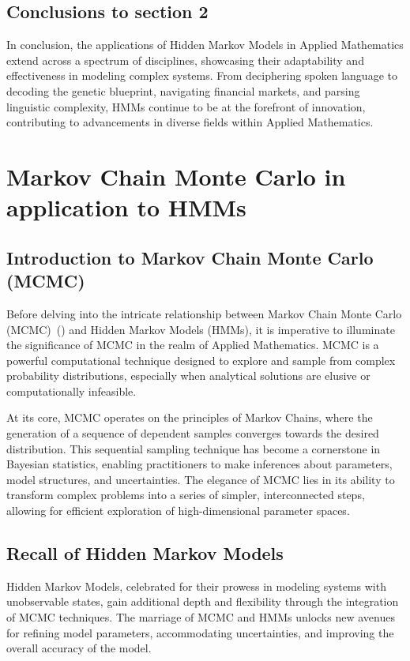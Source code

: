 \documentclass{englishreport}
\begin{document}
\subsection{Conclusions to section 2}

In conclusion, the applications of Hidden Markov Models in Applied Mathematics extend across a spectrum of disciplines, showcasing their adaptability and effectiveness in modeling complex systems. From deciphering spoken language to decoding the genetic blueprint, navigating financial markets, and parsing linguistic complexity, HMMs continue to be at the forefront of innovation, contributing to advancements in diverse fields within Applied Mathematics.

\newpage
\section{Markov Chain Monte Carlo in application to HMMs}

\subsection{Introduction to Markov Chain Monte Carlo (MCMC)}

Before delving into the intricate relationship between Markov Chain Monte Carlo (MCMC)~(\cite{Andrieu2008}) and Hidden Markov Models (HMMs), it is imperative to illuminate the significance of MCMC in the realm of Applied Mathematics. MCMC is a powerful computational technique designed to explore and sample from complex probability distributions, especially when analytical solutions are elusive or computationally infeasible.

At its core, MCMC operates on the principles of Markov Chains, where the generation of a sequence of dependent samples converges towards the desired distribution. This sequential sampling technique has become a cornerstone in Bayesian statistics, enabling practitioners to make inferences about parameters, model structures, and uncertainties. The elegance of MCMC lies in its ability to transform complex problems into a series of simpler, interconnected steps, allowing for efficient exploration of high-dimensional parameter spaces.

\subsection{Recall of Hidden Markov Models}

Hidden Markov Models, celebrated for their prowess in modeling systems with unobservable states, gain additional depth and flexibility through the integration of MCMC techniques. The marriage of MCMC and HMMs unlocks new avenues for refining model parameters, accommodating uncertainties, and improving the overall accuracy of the model.
\end{document}
